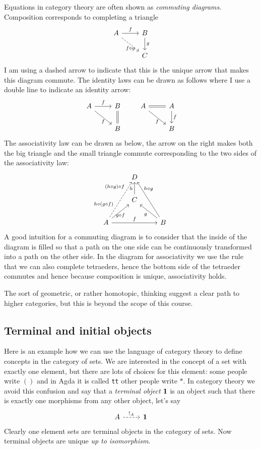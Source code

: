 Equations in category theory are often shown as \emph{commuting diagrams}. Composition corresponds to completing a triangle
\[\begin{tikzcd}
A \arrow[rd, dashrightarrow,"f\circ g" below] \arrow[r,"f"] & B \arrow[d,"g"]\\
& C
\end{tikzcd}
\]
I am using a dashed arrow to indicate that this is the unique arrow that makes this diagram commute. 
The identity laws can be drawn as follows where I use a double line to indicate an identity arrow:
\[\begin{tikzcd}
A \arrow[rd,"f" below] \arrow[r,"f"] & B \arrow[d,equal]\\
& B
\end{tikzcd}
\qquad
\begin{tikzcd}
A \arrow[rd,"f" below] \arrow[r,equal] & A \arrow[d,"f"]\\
& B
\end{tikzcd}
\]
The associativity law can be drawn as below, the arrow on the right makes both the big triangle and the small triangle commute corresponding to the two sides of the associativity law:
\[\begin{tikzcd}
    & D  &\\
   & C  \arrow[u,"h"] & \\
A \arrow[ur,"g \circ f" below]\arrow[rr,"f"] 
\arrow[uur,dashrightarrow,"h \circ(g \circ f)" near start,"(h\circ g)\circ f" near end] &     & B \arrow[ul,"g"]\arrow[uul,"h \circ g" above=10]
\end{tikzcd}
\]
A good intuition for a commuting diagram is to consider that the inside of the diagram is filled so that a path on the one side can be continuously transformed into a path on the other side. In the diagram for associativity we use the rule that we can also complete tetraeders, hence the bottom side of the tetraeder commutes and hence because composition is unique, associativity holds.

The sort of geometric, or rather homotopic, thinking suggest a clear path to higher categories, but this is beyond the scope of this course.

\subsection{Terminal and initial objects}
\label{sec:term-init-objects}

Here is an example how we can use the language of category theory to define concepts in the category of sets. We are interested in the concept of a set with exactly one element, but there are lots of choices for this element: some people write $()$ and in Agda it is called \texttt{tt} other people write $*$. In category theory we avoid this confusion and say that a \emph{terminal object} $\bf{1}$ is an object such that there is exactly one morphisms from any other object, let's say 
\[\begin{tikzcd}
  A \arrow[r, dashrightarrow, "!_A"] & \bf{1}
\end{tikzcd}\]
Clearly one element sets are terminal objects in the category of sets. Now terminal objects are unique \emph{up to isomorphism}. 

